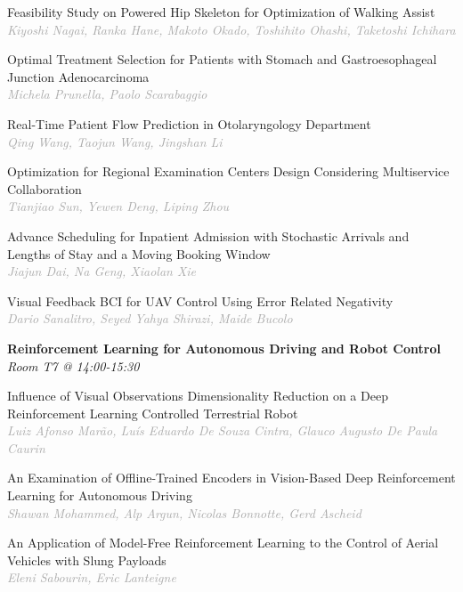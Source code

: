 \begin{multicols*}{2}
\small Feasibility Study on Powered Hip Skeleton for Optimization of Walking Assist\\ 
\footnotesize \textcolor{darkgray}{\textit{Kiyoshi Nagai, Ranka  Hane, Makoto  Okado, Toshihito  Ohashi, Taketoshi  Ichihara}}

\small Optimal Treatment Selection for Patients with Stomach and Gastroesophageal Junction Adenocarcinoma\\ 
\footnotesize \textcolor{darkgray}{\textit{Michela Prunella, Paolo  Scarabaggio}}

\small Real-Time Patient Flow Prediction in Otolaryngology Department\\ 
\footnotesize \textcolor{darkgray}{\textit{Qing Wang, Taojun  Wang, Jingshan  Li}}

\small Optimization for Regional Examination Centers Design Considering Multiservice Collaboration\\ 
\footnotesize \textcolor{darkgray}{\textit{Tianjiao Sun, Yewen  Deng, Liping  Zhou}}

\small Advance Scheduling for Inpatient Admission with Stochastic Arrivals and Lengths of Stay and a Moving Booking Window\\ 
\footnotesize \textcolor{darkgray}{\textit{Jiajun Dai, Na  Geng, Xiaolan  Xie}}

\small Visual Feedback BCI for UAV Control Using Error Related Negativity\\ 
\footnotesize \textcolor{darkgray}{\textit{Dario Sanalitro, Seyed Yahya  Shirazi, Maide  Bucolo}}

\normalsize \textbf{Reinforcement Learning for Autonomous Driving and Robot Control}\\
\small \textit{Room T7 @ 14:00-15:30}

\small Influence of Visual Observations Dimensionality Reduction on a Deep Reinforcement Learning Controlled Terrestrial Robot\\ 
\footnotesize \textcolor{darkgray}{\textit{Luiz Afonso Marão, Luís Eduardo  De Souza Cintra, Glauco Augusto De Paula  Caurin}}

\small An Examination of Offline-Trained Encoders in Vision-Based Deep Reinforcement Learning for Autonomous Driving\\ 
\footnotesize \textcolor{darkgray}{\textit{Shawan Mohammed, Alp  Argun, Nicolas  Bonnotte, Gerd  Ascheid}}

\small An Application of Model-Free Reinforcement Learning to the Control of Aerial Vehicles with Slung Payloads\\ 
\footnotesize \textcolor{darkgray}{\textit{Eleni Sabourin, Eric  Lanteigne}}


\end{multicols*}
